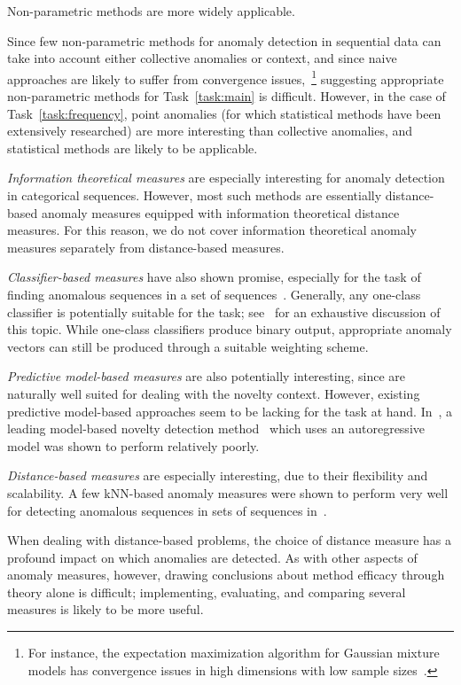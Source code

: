 Non-parametric methods are more widely applicable.

Since few non-parametric methods for anomaly detection in sequential data can take into account either collective anomalies or context, and since naive approaches are likely to suffer from convergence issues,~\footnote{For instance, the expectation maximization algorithm for Gaussian mixture models has convergence issues in high dimensions with low sample sizes~\cite{TODO}.} suggesting appropriate non-parametric methods for Task~\ref{task:main} is difficult. However, in the case of Task~\ref{task:frequency}, point anomalies (for which statistical methods have been extensively researched) are more interesting than collective anomalies, and statistical methods are likely to be applicable.

\emph{Information theoretical measures} are especially interesting for anomaly detection in categorical sequences. However, most such methods are essentially distance-based anomaly measures equipped with information theoretical distance measures. For this reason, we do not cover information theoretical anomaly measures separately from distance-based measures.

\emph{Classifier-based measures} have also shown promise, especially for the task of finding anomalous sequences in a set of sequences~\cite{chandola3}. Generally, any one-class classifier is potentially suitable for the task; see~\cite{classification} for an exhaustive discussion of this topic. While one-class classifiers produce binary output, appropriate anomaly vectors can still be produced through a suitable weighting scheme.

\emph{Predictive model-based measures} are also potentially interesting, since are naturally well suited for dealing with the novelty context. However, existing predictive model-based approaches seem to be lacking for the task at hand. In~\cite{chandola3}, a leading model-based novelty detection method~\cite{perkins2} which uses an autoregressive model was shown to perform relatively poorly.

\emph{Distance-based measures} are especially interesting, due to their flexibility and scalability. A few kNN-based anomaly measures were shown to perform very well for detecting anomalous sequences in sets of sequences in~\cite{chandola3}.

When dealing with distance-based problems, the choice of distance measure has a profound impact on which anomalies are detected. As with other aspects of anomaly measures, however, drawing conclusions about method efficacy through theory alone is difficult; implementing, evaluating, and comparing several measures is likely to be more useful.

